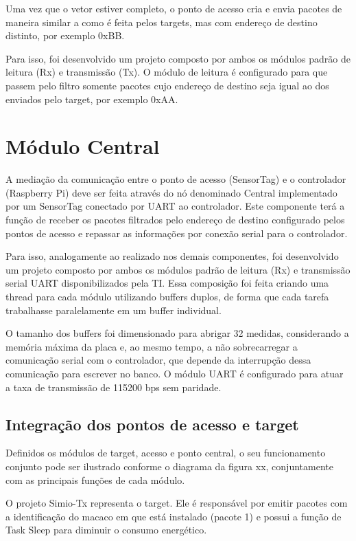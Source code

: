 Uma vez que o vetor estiver completo, o ponto de acesso cria e envia pacotes de maneira similar a como é feita pelos targets, mas com endereço de destino distinto, por exemplo 0xBB.

Para isso, foi desenvolvido um projeto composto por ambos os módulos padrão de leitura (Rx) e transmissão (Tx). O módulo de leitura é configurado para que passem pelo filtro somente pacotes cujo endereço de destino seja igual ao dos enviados pelo target, por exemplo 0xAA.

\section{Módulo Central}

A mediação da comunicação entre o ponto de acesso (SensorTag) e o controlador (Raspberry Pi) deve ser feita através do nó denominado Central implementado por um SensorTag conectado por UART ao controlador.
Este componente terá a função de receber os pacotes filtrados pelo endereço de destino configurado pelos pontos de acesso e repassar as informações por conexão serial para o controlador.

Para isso, analogamente ao realizado nos demais componentes, foi desenvolvido um projeto composto por ambos os módulos padrão de leitura (Rx) e transmissão serial UART disponibilizados pela TI. Essa composição foi feita criando uma thread para cada módulo utilizando buffers duplos, de forma que cada tarefa trabalhasse paralelamente em um buffer individual.

O tamanho dos buffers foi dimensionado para abrigar 32 medidas, considerando a memória máxima da placa e, ao mesmo tempo, a não sobrecarregar a comunicação serial com o controlador, que depende da interrupção dessa comunicação para escrever no banco. O módulo UART é configurado para atuar a taxa de transmissão de 115200 bps sem paridade.

\subsection{Integração dos pontos de acesso e target}

Definidos os módulos de target, acesso e ponto central, o seu funcionamento conjunto pode ser ilustrado conforme o diagrama da figura xx, conjuntamente com as principais funções de cada módulo. 

O projeto Simio-Tx representa o target. Ele é responsável por emitir pacotes com a identificação do macaco em que está instalado (pacote 1) e possui a função de Task Sleep para diminuir o consumo energético.

